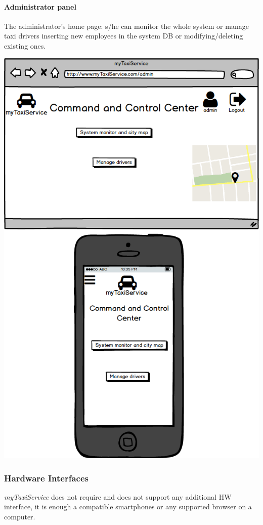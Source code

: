 \documentclass[a4paper,11pt]{report} %
\newcommand{\mts}{\mbox{\normalfont\itshape myTaxiService}}
\begin{document}
	\paragraph{Administrator panel} The administrator's home page: s/he can monitor the whole system or manage taxi drivers inserting new employees in the system DB or modifying/deleting existing ones.
	\begin{center}
		\includegraphics[width=0.9\linewidth]{Pictures/AdminPage}
	\end{center}
	\pagebreak	
	
	\subsubsection{Hardware Interfaces} \mts{} does not require and does not support any additional HW interface, it is enough a compatible smartphones or any supported browser on a computer.
	
\end{document}

